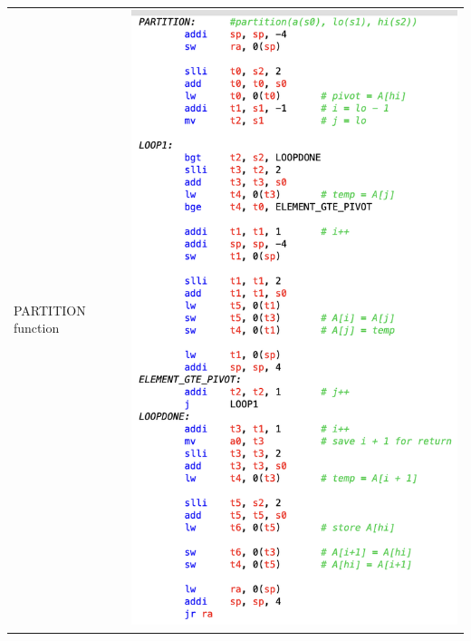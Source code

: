 \documentclass[10pt,a4paper]{article}
\begin{document}
\begin{ans}
\begin{table}[htbp]
\begin{center}
\begin{tabular}[H]{|M{3cm}|M{12cm}|}
					\hline
					PARTITION function 
					& \includegraphics[scale = 0.7]{Lab1-2-2.png}\\


\end{tabular}
\end{center}
\end{table}
\end{ans}
\end{document}
